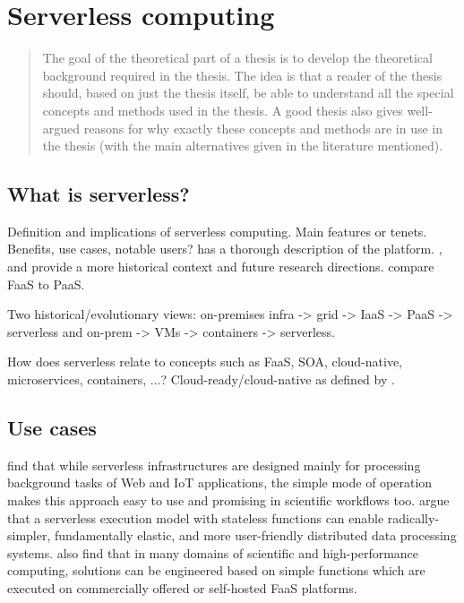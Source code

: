 \documentclass[utf8,english]{gradu3}
\begin{document}
\chapter{Serverless computing}

\begin{quote}
The goal of the theoretical part of a thesis is to develop the theoretical background required in the thesis.  The idea is that a reader of the thesis should, based on just the thesis itself, be able to understand all the special concepts and methods used in the thesis. A good thesis also gives well-argued reasons for why exactly these concepts and methods are in use in the thesis (with the main alternatives given in the literature mentioned).
\end{quote}

\section{What is serverless?}

Definition and implications of serverless computing. Main features or tenets. Benefits, use cases, notable users? \textcite{robert2016serverlessarchitectures} has a thorough description of the platform.  \textcite{van2017spec}, \textcite{varghese18next} and \textcite{buyya2017manifesto} provide a more historical context and future research directions. \textcite{albuquerque17faaspaas} compare FaaS to PaaS.

Two historical/evolutionary views: on-premises infra -> grid -> IaaS -> PaaS -> serverless and on-prem -> VMs -> containers -> serverless.

How does serverless relate to concepts such as FaaS, SOA, cloud-native, microservices, containers, ...? Cloud-ready/cloud-native as defined by \textcite{pozdniakova17cloudready}.

\section{Use cases}

\textcite{malawski17executescientific} find that while serverless infrastructures are designed mainly for processing background tasks of Web and IoT applications, the simple mode of operation makes this approach easy to use and promising in scientific workflows too. \textcite{jonas17occupy} argue that a serverless execution model with stateless functions can enable radically-simpler, fundamentally elastic, and more user-friendly distributed data processing systems. \textcite{spillner18faaster} also find that in many domains of scientific and high-performance computing, solutions can be engineered based on simple functions which are executed on commercially offered or self-hosted FaaS platforms.
\end{document}
